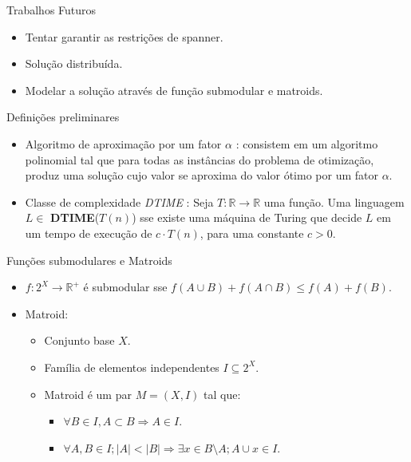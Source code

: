 \documentclass[10pt]{beamer}
\begin{document}
\begin{frame}{Trabalhos Futuros}
\begin{itemize}
  \item <2-> Tentar garantir as restrições de spanner.
  \item <3-> Solução distribuída.
  \item <4-> Modelar a solução através de função submodular e matroids.
\end{itemize}

\end{frame}


\begin{frame}{Definições preliminares}
\hypertarget{DTIME_slide}{}
  \begin{itemize}
    \item Algoritmo de aproximação por um fator $\alpha$ \cite{Williamson2011}: consistem em um algoritmo polinomial tal que para todas as instâncias do problema de otimização, 
produz uma solução cujo valor se aproxima do valor ótimo por um fator $\alpha$.
    \item Classe de complexidade \emph{DTIME} \cite{Arora2009}: Seja $T : \mathbb{R} \rightarrow \mathbb{R}$ uma função. Uma linguagem $L \in$  \textbf{DTIME}($T(n)$) sse 
existe uma máquina de Turing que decide $L$ em um tempo de execução de $c \cdot T(n)$, para uma constante $c > 0$. \hyperlink{DTIME}{}
  \end{itemize}
\end{frame}

\begin{frame}{Funções submodulares e Matroids \hyperlink{matroid}{}}
\hypertarget{matroid_slide}{}
\begin{itemize}
  \item $f: 2^{X} \rightarrow \mathbb{R}^+$ é submodular sse $f(A \cup B) + f(A \cap B) \le f(A) + f(B)$.
  \item Matroid:
  \begin{itemize}
    \item Conjunto base $X$.
    \item Família de elementos independentes $I \subseteq 2^{X}$.
    \item Matroid é um par $M = (X,I)$ tal que:
    \begin{itemize}
      \item $\forall B \in I, A \subset B \Rightarrow A \in I$.
      \item $\forall A,B \in I; |A| < |B| \Rightarrow \exists x \in B \setminus A; A \cup x \in I$.
    \end{itemize}
  \end{itemize}
\end{itemize}
\end{frame}
\end{document}
